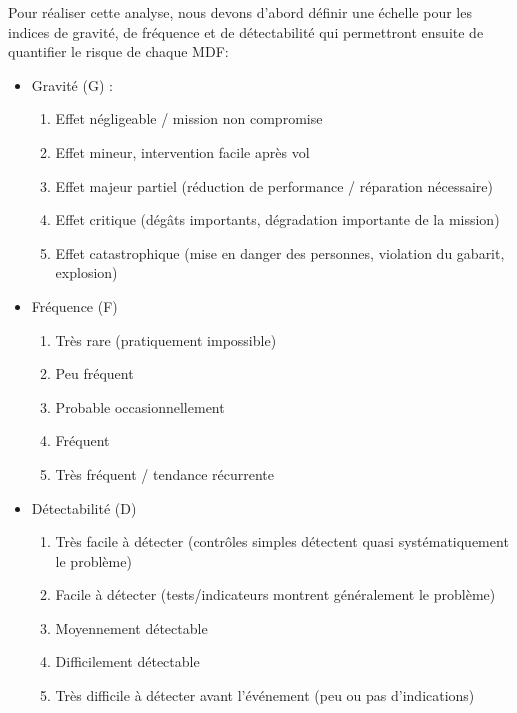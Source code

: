 Pour réaliser cette analyse, nous devons d’abord définir une échelle pour les indices de gravité, de fréquence et de détectabilité
qui permettront ensuite de quantifier le risque de chaque \acrshort{MDF}:\\
\begin{itemize}
    \item Gravité (G) :
    \begin{enumerate}
        \item Effet négligeable / mission non compromise
        \item Effet mineur, intervention facile après vol
        \item Effet majeur partiel (réduction de performance / réparation nécessaire)
        \item Effet critique (dégâts importants, dégradation importante de la mission)
        \item Effet catastrophique (mise en danger des personnes, violation du gabarit, explosion)\\
    \end{enumerate}
    \item Fréquence (F)
    \begin{enumerate}
        \item Très rare (pratiquement impossible)
        \item Peu fréquent
        \item Probable occasionnellement
        \item Fréquent
        \item Très fréquent / tendance récurrente\\
    \end{enumerate}
    \item Détectabilité (D)
    \begin{enumerate}
        \item Très facile à détecter (contrôles simples détectent quasi systématiquement le problème)
        \item Facile à détecter (tests/indicateurs montrent généralement le problème)
        \item Moyennement détectable
        \item Difficilement détectable
        \item Très difficile à détecter avant l’événement (peu ou pas d’indications)\\
    \end{enumerate}
\end{itemize}

